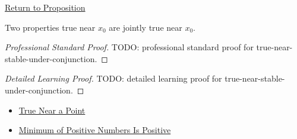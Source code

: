 \newpage
{}
\label{prf:true-near-stable-under-conjunction}

\begin{remark*}[Return]
\hyperref[prop:true-near-stable-under-conjunction]{Return to Proposition}
\end{remark*}

\begin{proposition*}
Two properties true near \(x_0\) are jointly true near \(x_0\).
\end{proposition*}

\begin{proof}[Professional Standard Proof]
\LRAProofBodyStart
TODO: professional standard proof for true-near-stable-under-conjunction.
\end{proof}

\begin{proof}[Detailed Learning Proof]
\LRAProofBodyStart
TODO: detailed learning proof for true-near-stable-under-conjunction.
\end{proof}

\begin{remark*}
\end{remark*}

\begin{dependencies}
\begin{itemize}
  \item \hyperref[def:true-near]{True Near a Point}
  \item \hyperref[lem:minimum-of-positive-numbers-is-positive]{Minimum of Positive Numbers Is Positive}
\end{itemize}
\end{dependencies}

\clearpage
